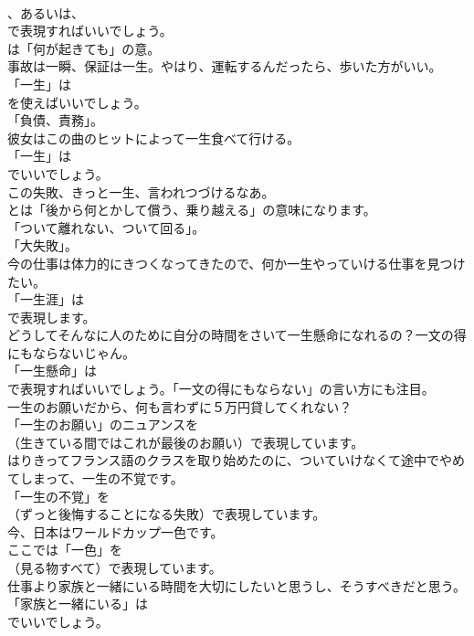 \documentclass[8pt]{extreport}
\begin{document}
\begin{CJK}{UTF8}{min}
\\	、あるいは、
\\	で表現すればいいでしょう。
\\	は「何が起きても」の意。	
\\	事故は一瞬、保証は一生。やはり、運転するんだったら、歩いた方がいい。 
\\	「一生」は
\\	を使えばいいでしょう。
\\	「負債、責務」。	
\\	彼女はこの曲のヒットによって一生食べて行ける。 
\\	「一生」は
\\	でいいでしょう。	
\\	この失敗、きっと一生、言われつづけるなあ。 
\\	とは「後から何とかして償う、乗り越える」の意味になります。
\\	「ついて離れない、ついて回る」。
\\	「大失敗」。	
\\	今の仕事は体力的にきつくなってきたので、何か一生やっていける仕事を見つけたい。 
\\	「一生涯」は
\\	で表現します。	
\\	どうしてそんなに人のために自分の時間をさいて一生懸命になれるの？一文の得にもならないじゃん。 
\\	「一生懸命」は 
\\	で表現すればいいでしょう。「一文の得にもならない」の言い方にも注目。	
\\	一生のお願いだから、何も言わずに５万円貸してくれない？ 
\\	「一生のお願い」のニュアンスを
\\	（生きている間ではこれが最後のお願い）で表現しています。	
\\	はりきってフランス語のクラスを取り始めたのに、ついていけなくて途中でやめてしまって、一生の不覚です。 
\\	「一生の不覚」を 
\\	（ずっと後悔することになる失敗）で表現しています。	
\\	今、日本はワールドカップ一色です。 
\\	ここでは「一色」を 
\\	（見る物すべて）で表現しています。	
\\	仕事より家族と一緒にいる時間を大切にしたいと思うし、そうすべきだと思う。 
\\	「家族と一緒にいる」は
\\	でいいでしょう。	

\end{CJK}
\end{document}
